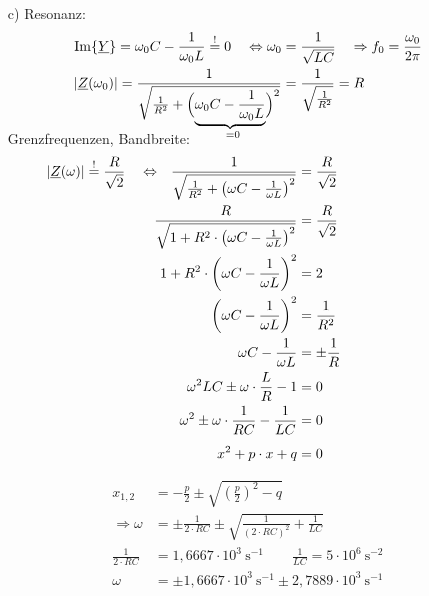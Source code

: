 {\begin{itemize}
    \item[c)] Resonanz:
    \begin{align*}
        \Im\{\underline{Y}\} = \omega_0 C - \frac{1}{\omega_0 L} \overset{!}{=} 0 \quad \Leftrightarrow \omega_0 &= \frac{1}{\sqrt{LC}} \quad \Rightarrow f_0 = \frac{\omega_0}{2\pi}\\
        |\underline{Z}(\omega_0)| = \frac{1}{%
            \sqrt{\frac{1}{R^2} +
                \Big(\smash{\underbrace{
                    \omega_0 C - \frac{1}{\omega_0 L}
                }_{={}\mathrlap{0}}}\Big)^2
            }
        } &= \frac{1}{\sqrt{\frac{1}{R^2}}} = R
    \end{align*}%
    Grenzfrequenzen, Bandbreite:
    \begin{align*}
        \mathllap{|\underline{Z}(\omega)| \overset{!}{=} \frac{R}{\sqrt{2}} \quad \Leftrightarrow \quad}
        \frac{1}{\sqrt{\frac{1}{R^2} + \left(\omega C - \frac{1}{\omega L}\right)^2}} &= \frac{R}{\sqrt{2}} \\
        \frac{R}{\sqrt{1 + R^2\cdot\left(\omega C - \frac{1}{\omega L}\right)^2}} &= \frac{R}{\sqrt{2}} \\
        1 + R^2\cdot\left(\omega C - \frac{1}{\omega L}\right)^2 &= 2 \\
        \left(\omega C - \frac{1}{\omega L}\right)^2 &= \frac{1}{R^2} \\
        \omega C - \frac{1}{\omega L} &= \pm\frac{1}{R} \\
        \omega^2 LC \pm \omega \cdot \frac{L}{R} - 1 &= 0 \\
        \omega^2 \pm \omega \cdot \frac{1}{RC} - \frac{1}{LC} &= 0 \\
        x^2 + p \cdot x + q &= 0 \vphantom{\frac{1}{LC}}%
    \end{align*}
    \begin{align*}
        x_{1,2} &= -\frac{p}{2} \pm \sqrt{\left(\frac{p}{2}\right)^2 - q} \\ %
        \Rightarrow \omega &= \pm \frac{1}{2 \cdot RC} \pm \sqrt{\frac{1}{(2 \cdot RC)^2} + \frac{1}{LC}}\\
        \frac{1}{2 \cdot RC} &= 1,6667 \cdot 10^3\ \mathrm{s}^{-1} \qquad
        \frac{1}{LC} = 5 \cdot 10^6\ \mathrm{s}^{-2} \\[4pt]
        \omega &= \pm 1,6667 \cdot 10^3\ \mathrm{s}^{-1} \pm 2,7889 \cdot 10^3\ \mathrm{s}^{-1} \\[4pt]

\end{align*}
\end{itemize}}

